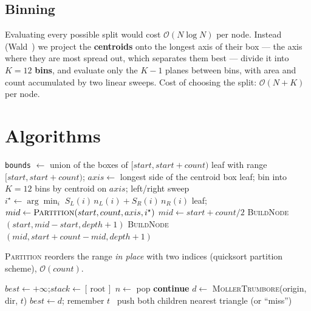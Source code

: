 \documentclass[11pt]{article}
\begin{document}
\subsection{Binning}

Evaluating every possible split would cost $\mathcal{O}(N\log N)$ per node.
Instead (Wald~\cite{wald}) we project the \textbf{centroids} onto the longest axis
of their box --- the axis where they are most spread out, which separates them best
--- divide it into $K{=}12$ \textbf{bins}, and evaluate only the $K-1$ planes
between bins, with area and count accumulated by two linear sweeps. Cost of
choosing the split: $\mathcal{O}(N + K)$ per node.

\section{Algorithms}

\begin{algorithm}[h]
\caption{\textsc{BuildNode}(start, count, depth)}
\begin{algorithmic}[1]
\State \texttt{bounds} $\gets$ union of the boxes of $[start,start+count)$
    \State leaf with range $[start, start+count)$; \Return {}
\EndIf
\State $axis \gets$ longest side of the centroid box
 leaf; \Return \EndIf
\State bin into $K{=}12$ bins by centroid on $axis$; left/right sweep
\State $i^\star \gets \arg\min_i\; S_L(i)\,n_L(i) + S_R(i)\,n_R(i)$
 leaf; \Return {} \EndIf
\State $mid \gets \textsc{Partition}(start, count, axis, i^\star)$
 $mid \gets start + count/2$  \EndIf
\State \textsc{BuildNode}$(start, mid-start, depth+1)$
\State \textsc{BuildNode}$(mid, start+count-mid, depth+1)$
\end{algorithmic}
\end{algorithm}

\noindent
\textsc{Partition} reorders the range \emph{in place} with two indices (quicksort
partition scheme), $\mathcal{O}(count)$.

\begin{algorithm}[h]
\caption{\textsc{Intersect}(origin, dir)}
\begin{algorithmic}[1]
\State $best \gets +\infty$;\quad $stack \gets [\,\text{root}\,]$
    \State $n \gets$ pop
     \textbf{continue}  \EndIf
            \State $d \gets$ \textsc{MollerTrumbore}(origin, dir, $t$)
             $best \gets d$; remember $t$ \EndIf
        \EndFor
    \Else\ push both children
    \EndIf
\EndWhile
\State \Return nearest triangle (or ``miss'')
\end{algorithmic}
\end{algorithm}
\end{document}
